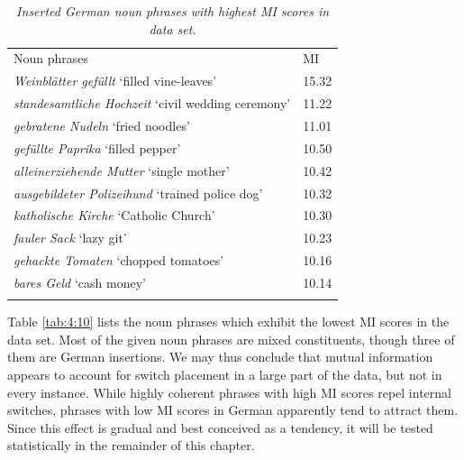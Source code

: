 \begin{table}
		{\begin{tabularx}{\textwidth}{XR{1.4cm}} \midrule
			\addlinespace[2mm]
			Noun phrases	& MI \\ \addlinespace[2mm] \midrule
			\addlinespace[2mm]
			\textit{Weinblätter gefüllt	} `filled vine-leaves'	&15.32\\
			\textit{standesamtliche Hochzeit} `civil wedding ceremony'	&11.22\\
			\textit{gebratene Nudeln	} `fried noodles'	&11.01\\
			\textit{gefüllte Paprika} `filled pepper'	&10.50\\
			\textit{alleinerziehende Mutter} `single mother'	&10.42\\
			\textit{ausgebildeter Polizeihund}	`trained police dog'	&10.32\\
			\textit{katholische Kirche} `Catholic Church'	&10.30\\
			\textit{fauler Sack} `lazy git'		&10.23\\
			\textit{gehackte Tomaten} `chopped tomatoes'	&10.16\\
			\textit{bares Geld}	 `cash money'	&10.14\\
\addlinespace[2mm]
			\midrule 
		\end{tabularx}}
\caption{\textit{Inserted German noun phrases with highest MI scores in data set.}} \label{tab:4:9}
\end{table}


Table \ref{tab:4:10} lists the noun phrases which exhibit the lowest MI scores in the data set. Most of the given noun phrases are mixed constituents, though three of them are German insertions. We may thus conclude that mutual information appears to account for switch placement in a large part of the data, but not in every instance. While highly coherent phrases with high MI scores repel internal switches, phrases with low MI scores in German apparently tend to attract them. Since this effect is gradual and best conceived as a tendency, it will be tested statistically in the remainder of this chapter.


